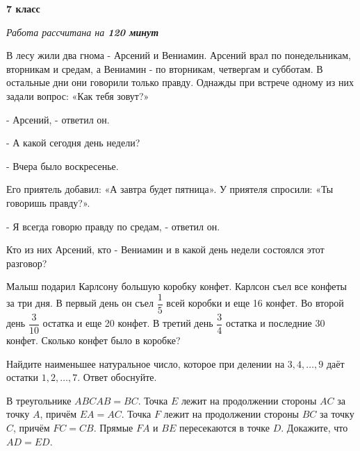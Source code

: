 \centerline{\bf \huge 7 класс}
\centerline{\normalsize{\it Работа рассчитана на \bf{120} минут}}

В лесу жили два гнома - Арсений и Вениамин. Арсений врал по понедельникам, вторникам и средам, а Вениамин - по вторникам, четвергам и субботам. В остальные дни они говорили только правду. Однажды при встрече одному из них задали вопрос: «Как тебя зовут?»

- Арсений, - ответил он.

- А какой сегодня день недели?

- Вчера было воскресенье.

Его приятель добавил: «А завтра будет пятница». У приятеля спросили: «Ты говоришь правду?».

- Я всегда говорю правду по средам, - ответил он.

Кто из них Арсений, кто - Вениамин и в какой день недели состоялся этот разговор?

Малыш подарил Карлсону большую коробку конфет. Карлсон съел все конфеты за три дня. В первый день он съел $\dfrac{1}{5}$ всей коробки и еще 16 конфет. Во второй день $\dfrac{3}{10}$ остатка и еще 20 конфет. В третий день $\dfrac{3}{4}$ остатка и последние 30 конфет. Сколько конфет было в коробке?


Найдите наименьшее натуральное число, которое при делении на $3,4, \ldots, 9$ даёт остатки $1, 2, \ldots, 7.$ Ответ обоснуйте.

В треугольнике $A B C A B=B C$. Точка $E$ лежит на продолжении стороны $A C$ за точку $A$, причём $E A=A C$. Точка $F$ лежит на продолжении стороны $B C$ за точку $C$, причём $F C=C B$. Прямые $F A$ и $B E$ пересекаются в точке $D$. Докажите, что $A D=E D$.

